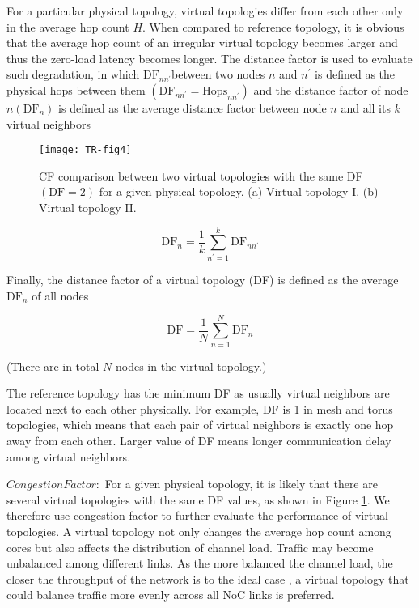 For a particular physical topology, virtual topologies differ from each other only in the average hop count $H$. When compared to reference topology, it is obvious that the average hop count of an irregular virtual topology becomes larger and thus the zero-load latency becomes longer. The distance factor is used to evaluate such degradation, in which $\mathrm{DF}_{n n^{\prime}}$between two nodes $n$ and $ n^{\prime}$ is defined as the physical hops between them $\left(\mathrm{DF}_{n n^{\prime}}=\mathrm{Hops}_{n n^{\prime}}\right)$ and the distance factor of node $n\left(\mathrm{DF}_{n}\right)$ is defined as the average distance factor between node $n$   and all its $k$ virtual neighbors

\begin{figure}[t]
    \centering
        \texttt{[image: TR-fig4]}
          \caption{ CF comparison between two virtual topologies with the same DF $(\mathrm{DF}=2)$ for a given physical topology. (a) Virtual topology I. (b) Virtual topology II.}
             \label{fig4}
\end{figure}

\begin{equation}
    \mathrm{DF}_{n}=\frac{1}{k} \sum_{n^{\prime}=1}^{k} \mathrm{DF}_{n n^{\prime}}
            \label{eq1}
\end{equation}

Finally, the distance factor of a virtual topology (DF) is defined as the average $\mathrm{DF}_{n}$ of all nodes

\begin{equation}
    \mathrm{DF}=\frac{1}{N} \sum_{n=1}^{N} \mathrm{DF}_{n}
            \label{eq2}
\end{equation}

(There are in total $N$ nodes in the virtual topology.)

The reference topology has the minimum DF as usually virtual neighbors are located next to each other physically. For example, DF is 1 in mesh and torus topologies, which means that each pair of virtual neighbors is exactly one hop away from each other. Larger value of DF means longer communication delay among virtual neighbors.

$Congestion Factor:$ For a given physical topology, it is likely that there are several virtual topologies with the same DF values, as shown in Figure \ref{fig4}. We therefore use congestion factor to further evaluate the performance of virtual topologies. A virtual topology not only changes the average hop count among cores but also affects the distribution of channel load. Traffic may become unbalanced among different links. As the more balanced the channel load, the closer the throughput of the network is to the ideal case \cite{dally2004principles}, a virtual topology that could balance traffic more evenly across all NoC links is preferred.

